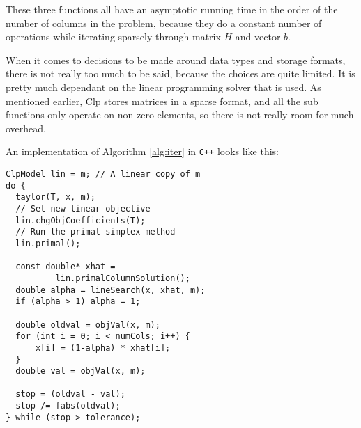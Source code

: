 These three functions all have an asymptotic running time in the order of the
number of columns in the problem, because they do a constant number of
operations while iterating sparsely through matrix $H$ and vector $b$.

When it comes to decisions to be made around data types and storage formats,
there is not really too much to be said, because the choices are quite limited.
It is pretty much dependant on the linear programming solver that is used.
As mentioned earlier, Clp stores matrices in a sparse format, and all the sub
functions only operate on non-zero elements, so there is not really room for
much overhead.

An implementation of Algorithm \ref{alg:iter} in \texttt{C++} looks like this:
\begin{verbatim}
ClpModel lin = m; // A linear copy of m
do {
  taylor(T, x, m);
  // Set new linear objective
  lin.chgObjCoefficients(T);
  // Run the primal simplex method
  lin.primal();

  const double* xhat = 
          lin.primalColumnSolution();
  double alpha = lineSearch(x, xhat, m);
  if (alpha > 1) alpha = 1;

  double oldval = objVal(x, m);
  for (int i = 0; i < numCols; i++) {
      x[i] = (1-alpha) * xhat[i];
  }
  double val = objVal(x, m);

  stop = (oldval - val);
  stop /= fabs(oldval);
} while (stop > tolerance);
\end{verbatim}
